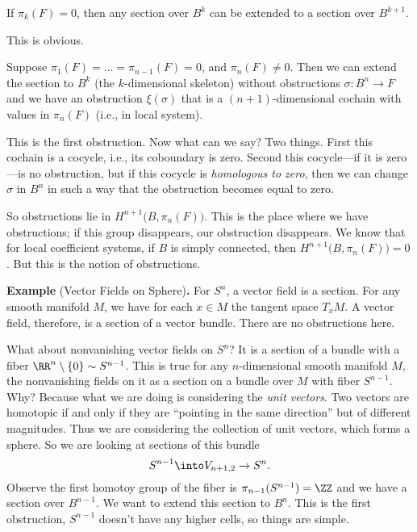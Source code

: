 \begin{thm}
If $\pi_{k}(F)=0$, then any section over $B^{k}$ can be extended
to a section over $B^{k+1}$.
\end{thm}
This is obvious.
\begin{thm}
Suppose $\pi_{1}(F)=\dots=\pi_{n-1}(F)=0$, and
$\pi_{n}(F)\not=0$. Then we can extend the section to $B^{k}$
(the $k$-dimensional skeleton) without obstructions $\sigma\colon
B^{n}\to F$ and we have an obstruction $\xi(\sigma)$ that is a
$(n+1)$-dimensional cochain with values in $\pi_{n}(F)$ (i.e., in
local system).
\end{thm}
This is the first obstruction. Now what can we say? Two
things. First this cochain is a cocycle, i.e., its coboundary is
zero. Second this cocycle---if it is zero---is no obstruction,
but if this cocycle is \emph{homologous to zero}, then we can
change $\sigma$ in $B^{n}$ in such a way that the obstruction
becomes equal to zero.

So obstructions lie in $H^{n+1}\bigl(B,\pi_{n}(F)\bigr)$. This is
the place where we have obstructions; if this group disappears,
our obstruction disappears. We know that for local coefficient
systems, if $B$ is simply connected, then
$H^{n+1}\bigl(B,\pi_{n}(F)\bigr)=0$. But this is the notion of
obstructions.

\medbreak
{}%
\noindent\textbf{Example \thethm} (Vector Fields on Sphere)\textbf{.}\quad
For $S^n$, a vector field is a section. For any smooth manifold
$M$, we have for each $x\in M$ the tangent space $T_{x}M$. A
vector field, therefore, is a section of a vector bundle. There
are no obstructions here.

What about nonvanishing vector fields on $S^n$? It is a section
of a bundle with a fiber $\RR^{n}\setminus\{0\}\homotopic S^{n-1}$.
This is true for any $n$-dimensional smooth manifold $M$, the
nonvanishing fields on it as a section on a bundle over $M$ with
fiber $S^{n-1}$. Why? Because what we are doing is considering
the \emph{unit vectors}. Two vectors are homotopic if and only if
they are ``pointing in the same direction'' but of different
magnitudes. Thus we are considering the collection of unit
vectors, which forms a sphere. So we are looking at sections of
this bundle
\begin{equation}
S^{n-1}\into V_{n+1,2}\to S^{n}.
\end{equation}
Observe the first homotoy group of the fiber is
$\pi_{n-1}(S^{n-1})=\ZZ$ and we have a section over $B^{n-1}$. We
want to extend this section to $B^{n}$. This is the first
obstruction, $S^{n-1}$ doesn't have any higher cells, so things
are simple.

